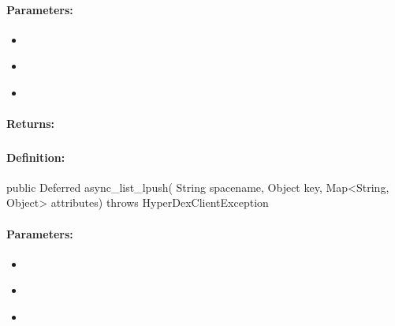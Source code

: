 \paragraph{Parameters:}
\begin{itemize}[noitemsep]
\item {}\\

\item {}\\

\item {}\\

\end{itemize}

\paragraph{Returns:}


\pagebreak
\subsubsection{}
\label{api:java:async_list_lpush}


\paragraph{Definition:}
\begin{javacode}
public Deferred async_list_lpush(
        String spacename,
        Object key,
        Map<String, Object> attributes) throws HyperDexClientException
\end{javacode}

\paragraph{Parameters:}
\begin{itemize}[noitemsep]
\item {}\\

\item {}\\

\item {}\\

\end{itemize}

